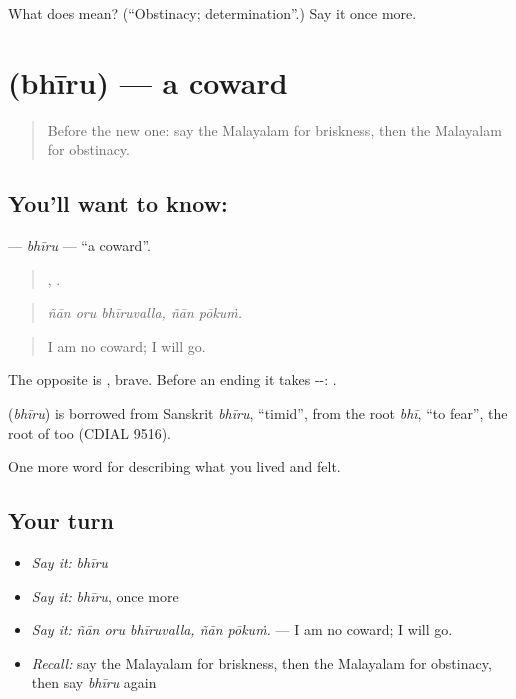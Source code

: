 \begin{tcolorbox}[breakable,colback=teal!4,colframe=teal!35!black,title={Before you move on}]
What does  mean? (\textquotedblleft{}Obstinacy; determination\textquotedblright{}.) Say it once more.
\end{tcolorbox}
\section[\texorpdfstring{\ml{ഭീരു} (bhīru)}{ഭീരു (bhīru)}]{ (bhīru) — a coward}

\label{lesson:ML-C530-bhiru}



\begin{quote}
Before the new one: say the Malayalam for briskness, then the Malayalam for obstinacy.
\end{quote}

\subsection*{You'll want to know: }
\textbf{} — \emph{bhīru} — \textquotedblleft{}a coward\textquotedblright{}.

\begin{quote}
  ,  .
\end{quote}

\begin{quote}
\emph{ñān oru bhīruvalla, ñān pōkuṁ.}
\end{quote}

\begin{quote}
I am no coward; I will go.
\end{quote}

The opposite is , brave. Before an ending it takes --: .

\begin{cousinweb}
\textbf{} (\emph{bhīru}) is borrowed from Sanskrit \emph{bhīru}, \textquotedblleft{}timid\textquotedblright{}, from the root \emph{bhī}, \textquotedblleft{}to fear\textquotedblright{}, the root of  too (CDIAL 9516).
\end{cousinweb}

\begin{grammarlens}[title={What you've built}]
One more word for describing what you lived and felt.
\end{grammarlens}

\subsection*{Your turn}
\begin{itemize}
\raggedright
  \item \emph{Say it:} \emph{bhīru}
  \item \emph{Say it:} \emph{bhīru}, once more
  \item \emph{Say it:} \emph{ñān oru bhīruvalla, ñān pōkuṁ.} — I am no coward; I will go.
  \item \emph{Recall:} say the Malayalam for briskness, then the Malayalam for obstinacy, then say \emph{bhīru} again
\end{itemize}


